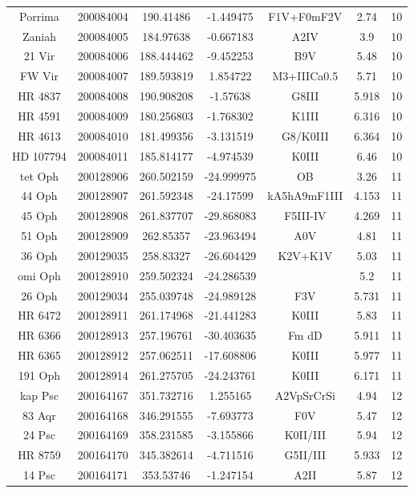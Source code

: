 \begin{table*}
\begin{tabular}{ccccccc}
Porrima & 200084004 & 190.41486 & -1.449475 & F1V+F0mF2V & 2.74 & 10 \\
Zaniah & 200084005 & 184.97638 & -0.667183 & A2IV & 3.9 & 10 \\
21 Vir & 200084006 & 188.444462 & -9.452253 & B9V & 5.48 & 10 \\
FW Vir & 200084007 & 189.593819 & 1.854722 & M3+IIICa0.5 & 5.71 & 10 \\
HR 4837 & 200084008 & 190.908208 & -1.57638 & G8III & 5.918 & 10 \\
HR 4591 & 200084009 & 180.256803 & -1.768302 & K1III & 6.316 & 10 \\
HR 4613 & 200084010 & 181.499356 & -3.131519 & G8/K0III & 6.364 & 10 \\
HD 107794 & 200084011 & 185.814177 & -4.974539 & K0III & 6.46 & 10 \\
tet Oph & 200128906 & 260.502159 & -24.999975 & OB & 3.26 & 11 \\
44 Oph & 200128907 & 261.592348 & -24.17599 & kA5hA9mF1III & 4.153 & 11 \\
45 Oph & 200128908 & 261.837707 & -29.868083 & F5III-IV & 4.269 & 11 \\
51 Oph & 200128909 & 262.85357 & -23.963494 & A0V & 4.81 & 11 \\
36 Oph & 200129035 & 258.83327 & -26.604429 & K2V+K1V & 5.03 & 11 \\
omi Oph & 200128910 & 259.502324 & -24.286539 &  & 5.2 & 11 \\
26 Oph & 200129034 & 255.039748 & -24.989128 & F3V & 5.731 & 11 \\
HR 6472 & 200128911 & 261.174968 & -21.441283 & K0III & 5.83 & 11 \\
HR 6366 & 200128913 & 257.196761 & -30.403635 & Fm dD & 5.911 & 11 \\
HR 6365 & 200128912 & 257.062511 & -17.608806 & K0III & 5.977 & 11 \\
191 Oph & 200128914 & 261.275705 & -24.243761 & K0III & 6.171 & 11 \\
kap Psc & 200164167 & 351.732716 & 1.255165 & A2VpSrCrSi & 4.94 & 12 \\
83 Aqr & 200164168 & 346.291555 & -7.693773 & F0V & 5.47 & 12 \\
24 Psc & 200164169 & 358.231585 & -3.155866 & K0II/III & 5.94 & 12 \\
HR 8759 & 200164170 & 345.382614 & -4.711516 & G5II/III & 5.933 & 12 \\
14 Psc & 200164171 & 353.53746 & -1.247154 & A2II & 5.87 & 12 \\

\end{tabular}
\end{table*}
